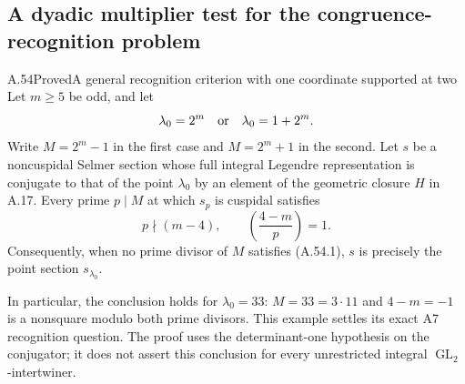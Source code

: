 \subsection{A dyadic multiplier test for the congruence-recognition problem}

\begin{statement}{A.54}{Proved}{A general recognition criterion with one coordinate supported at two}
Let $m\ge5$ be odd, and let
\[
 \lambda_0=2^m\quad\hbox{or}\quad\lambda_0=1+2^m.
\]
Write $M=2^m-1$ in the first case and $M=2^m+1$ in the second.
Let $s$ be a noncuspidal Selmer section whose full integral
Legendre representation is conjugate to that of the point
$\lambda_0$ by an element of the geometric closure $H$ in A.17.
Every prime $p\mid M$ at which $s_p$ is cuspidal satisfies
\[
             p\nmid(m-4),\qquad
             \left(\frac{4-m}{p}\right)=1.
\tag{A.54.1}
\]
Consequently, when no prime divisor of $M$ satisfies (A.54.1),
$s$ is precisely the point section $s_{\lambda_0}$.

In particular, the conclusion holds for $\lambda_0=33$:
$M=33=3\cdot11$ and $4-m=-1$ is a nonsquare modulo both
prime divisors.  This example settles its exact A7 recognition
question.  The proof uses the determinant-one hypothesis on the
conjugator; it does not assert this conclusion for every
unrestricted integral $\operatorname{GL}_2$-intertwiner.
\end{statement}

